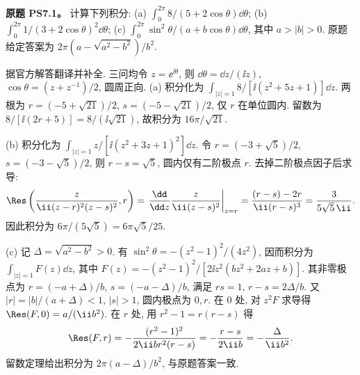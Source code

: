 
\begin{exercise}
\textbf{原题 PS7.1。}\label{ass:ps7-1}
计算下列积分:
(a) $\int_0^{2\pi}8/(5+2\cos\theta)\dd\theta$;
(b) $\int_0^{2\pi}1/(3+2\cos\theta)^2\dd\theta$;
(c) $\int_0^{2\pi}\sin^2\theta/(a+b\cos\theta)\dd\theta$, 其中 $a>|b|>0$. 原题给定答案为 $2\pi(a-\sqrt{a^2-b^2})/b^2$.
\end{exercise}
\begin{solution}
据官方解答翻译并补全. 三问均令 $z=\ee^{\ii\theta}$, 则 $\dd\theta=\dd z/(\ii z)$, $\cos\theta=(z+z^{-1})/2$, 圆周正向.
(a) 积分化为 $\int_{|z|=1}8/[\ii(z^2+5z+1)]\dd z$. 两根为 $r=(-5+\sqrt{21})/2$, $s=(-5-\sqrt{21})/2$, 仅 $r$ 在单位圆内. 留数为 $8/[\ii(2r+5)]=8/(\ii\sqrt{21})$, 故积分为 $16\pi/\sqrt{21}$.

(b) 积分化为 $\int_{|z|=1}z/[\ii(z^2+3z+1)^2]\dd z$. 令 $r=(-3+\sqrt5)/2$, $s=(-3-\sqrt5)/2$, 则 $r-s=\sqrt5$, 圆内仅有二阶极点 $r$. 去掉二阶极点因子后求导:
\[
 \Res\left(\frac{z}{\ii(z-r)^2(z-s)^2},r\right)
 =\left.\frac{\dd}{\dd z}\frac{z}{\ii(z-s)^2}\right|_{z=r}
 =\frac{(r-s)-2r}{\ii(r-s)^3}
 =\frac3{5\sqrt5\,\ii}.
\]
因此积分为 $6\pi/(5\sqrt5)=6\pi\sqrt5/25$.

(c) 记 $\Delta=\sqrt{a^2-b^2}>0$. 有 $\sin^2\theta=-(z^2-1)^2/(4z^2)$, 因而积分为 $\int_{|z|=1}F(z)\dd z$, 其中
$F(z)=-(z^2-1)^2/[2\ii z^2(bz^2+2az+b)]$.
其非零极点为 $r=(-a+\Delta)/b$, $s=(-a-\Delta)/b$, 满足 $rs=1$, $r-s=2\Delta/b$. 又 $|r|=|b|/(a+\Delta)<1$, $|s|>1$, 圆内极点为 $0,r$.
在 $0$ 处, 对 $z^2F$ 求导得 $\Res(F,0)=a/(\ii b^2)$.
在 $r$ 处, 用 $r^2-1=r(r-s)$ 得
\[
 \Res(F,r)=-\frac{(r^2-1)^2}{2\ii b r^2(r-s)}
 =-\frac{r-s}{2\ii b}=-\frac{\Delta}{\ii b^2}.
\]
留数定理给出积分为 $2\pi(a-\Delta)/b^2$, 与原题答案一致.
\end{solution}

